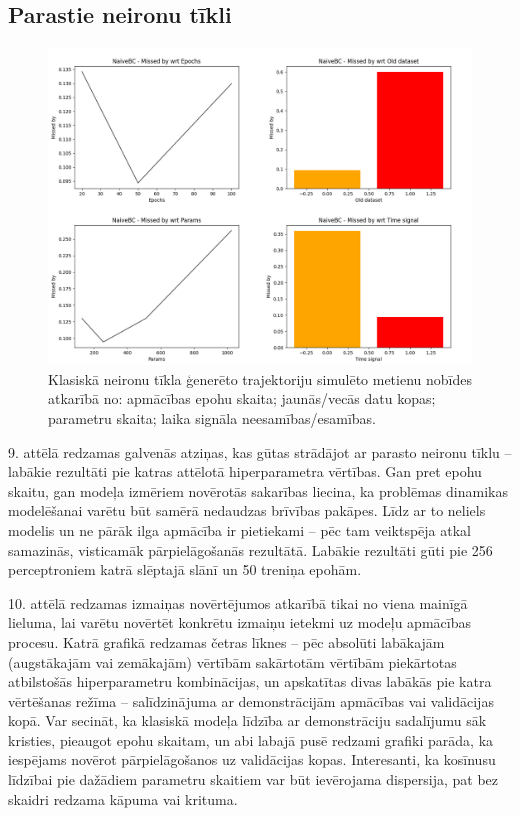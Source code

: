 \documentclass[12pt, a4paper]{article}
\numberwithin{equation}{section} %
\begin{document}
\subsection{Parastie neironu tīkli}

\begin{figure}[t!]
    \centering
    \includegraphics[width=16cm,page=1]{../img/naivebc_missed.png}
    \caption{Klasiskā neironu tīkla ģenerēto trajektoriju simulēto metienu nobīdes atkarībā no: apmācības epohu skaita; jaunās/vecās datu kopas; parametru skaita; laika signāla neesamības/esamības.}
\end{figure}

9. attēlā redzamas galvenās atziņas, kas gūtas strādājot ar parasto neironu tīklu -- labākie rezultāti pie katras attēlotā hiperparametra vērtības. Gan pret epohu skaitu, gan modeļa izmēriem novērotās sakarības liecina, ka problēmas dinamikas modelēšanai varētu būt samērā nedaudzas brīvības pakāpes. Līdz ar to neliels modelis un ne pārāk ilga apmācība ir pietiekami -- pēc tam veiktspēja atkal samazinās, visticamāk pārpielāgošanās rezultātā. Labākie rezultāti gūti pie 256 perceptroniem katrā slēptajā slānī un 50 treniņa epohām. 

10. attēlā redzamas izmaiņas novērtējumos atkarībā tikai no viena mainīgā lieluma, lai varētu novērtēt konkrētu izmaiņu ietekmi uz modeļu apmācības procesu. Katrā grafikā redzamas četras līknes -- pēc absolūti labākajām (augstākajām vai zemākajām) vērtībām sakārtotām vērtībām piekārtotas atbilstošās hiperparametru kombinācijas, un apskatītas divas labākās pie katra vērtēšanas režīma -- salīdzinājuma ar demonstrācijām apmācības vai validācijas kopā. Var secināt, ka klasiskā modeļa līdzība ar demonstrāciju sadalījumu sāk kristies, pieaugot epohu skaitam, un abi labajā pusē redzami grafiki parāda, ka iespējams novērot pārpielāgošanos uz validācijas kopas. Interesanti, ka kosīnusu līdzībai pie dažādiem parametru skaitiem var būt ievērojama dispersija, pat bez skaidri redzama kāpuma vai krituma.
\end{document}
